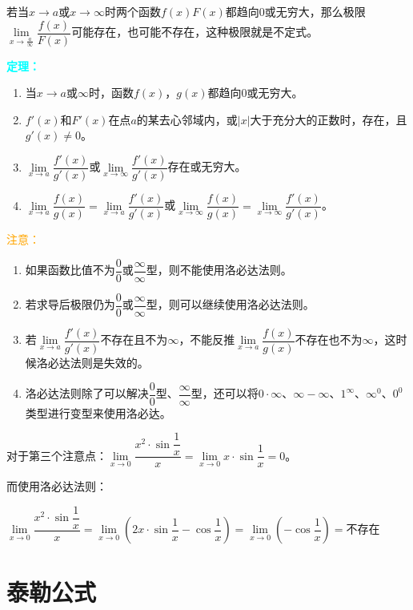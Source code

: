\documentclass[UTF8, 12pt]{ctexart}
\begin{document}
若当$x\to a$或$x\to\infty$时两个函数$f(x)F(x)$都趋向0或无穷大，那么极限$\lim\limits_{x\to \frac{a}{\infty}}\dfrac{f(x)}{F(x)}$可能存在，也可能不存在，这种极限就是不定式。\medskip

\textcolor{aqua}{\textbf{定理：}}

\begin{enumerate}
    \item 当$x\to a\text{或}\infty$时，函数$f(x)$，$g(x)$都趋向0或无穷大。
    \item $f'(x)$和$F'(x)$在点$a$的某去心邻域内，或$\vert x\vert$大于充分大的正数时，存在，且$g'(x)\neq 0$。
    \item $\lim\limits_{x\to a}\dfrac{f'(x)}{g'(x)}$或$\lim\limits_{x\to\infty}\dfrac{f'(x)}{g'(x)}$存在或无穷大。
    \item $\lim\limits_{x\to a}\dfrac{f(x)}{g(x)}=\lim\limits_{x\to a}\dfrac{f'(x)}{g'(x)}$或$\lim\limits_{x\to\infty}\dfrac{f(x)}{g(x)}=\lim\limits_{x\to\infty}\dfrac{f'(x)}{g'(x)}$。
\end{enumerate}

\textcolor{orange}{注意：}

\begin{enumerate}
    \item 如果函数比值不为$\dfrac{0}{0}$或$\dfrac{\infty}{\infty}$型，则不能使用洛必达法则。
    \item 若求导后极限仍为$\dfrac{0}{0}$或$\dfrac{\infty}{\infty}$型，则可以继续使用洛必达法则。
    \item 若$\lim\limits_{x\to a}\dfrac{f'(x)}{g'(x)}$不存在且不为$\infty$，不能反推$\lim\limits_{x\to a}\dfrac{f(x)}{g(x)}$不存在也不为$\infty$，这时候洛必达法则是失效的。
    \item 洛必达法则除了可以解决$\dfrac{0}{0}$型、$\dfrac{\infty}{\infty}$型，还可以将$0\cdot\infty$、$\infty-\infty$、$1^\infty$、$\infty^0$、$0^0$类型进行变型来使用洛必达。
\end{enumerate}

对于第三个注意点：$\lim\limits_{x\to 0}\dfrac{x^2\cdot\sin\dfrac{1}{x}}{x}=\lim\limits_{x\to 0}x\cdot\sin\dfrac{1}{x}=0$。

而使用洛必达法则：\medskip

$\lim\limits_{x\to 0}\dfrac{x^2\cdot\sin\dfrac{1}{x}}{x}=\lim\limits_{x\to 0}\left(2x\cdot\sin\dfrac{1}{x}-\cos\dfrac{1}{x}\right)=\lim\limits_{x\to 0}\left(-\cos\dfrac{1}{x}\right)=\text{不存在}$

\section{泰勒公式}
\end{document}
